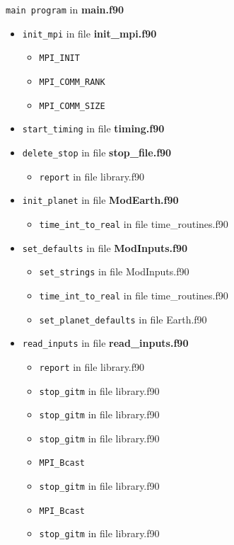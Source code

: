 {\tt main program} in {\bf main.f90}

\begin{itemize}



\item {\tt init\_mpi}   in file {\bf init\_mpi.f90}
  \begin{itemize}
    \item {\tt MPI\_INIT}
    \item {\tt MPI\_COMM\_RANK}
    \item {\tt MPI\_COMM\_SIZE}
  \end{itemize}


\item {\tt start\_timing}   in file {\bf timing.f90}


\item {\tt delete\_stop}   in file {\bf stop\_file.f90}
  \begin{itemize}
    \item {\tt report} in file library.f90
  \end{itemize}


\item {\tt init\_planet}   in file {\bf ModEarth.f90}
  \begin{itemize}
    \item {\tt time\_int\_to\_real} in file time\_routines.f90
  \end{itemize}


\item {\tt set\_defaults}   in file {\bf ModInputs.f90}
  \begin{itemize}
    \item {\tt set\_strings} in file ModInputs.f90
    \item {\tt time\_int\_to\_real} in file time\_routines.f90
    \item {\tt set\_planet\_defaults} in file Earth.f90
  \end{itemize}


\item {\tt read\_inputs}   in file {\bf read\_inputs.f90}
  \begin{itemize}
    \item {\tt report} in file library.f90
    \item {\tt stop\_gitm} in file library.f90
    \item {\tt stop\_gitm} in file library.f90
    \item {\tt stop\_gitm} in file library.f90
    \item {\tt MPI\_Bcast}
    \item {\tt stop\_gitm} in file library.f90
    \item {\tt MPI\_Bcast}
    \item {\tt stop\_gitm} in file library.f90
  \end{itemize}



\end{itemize}
